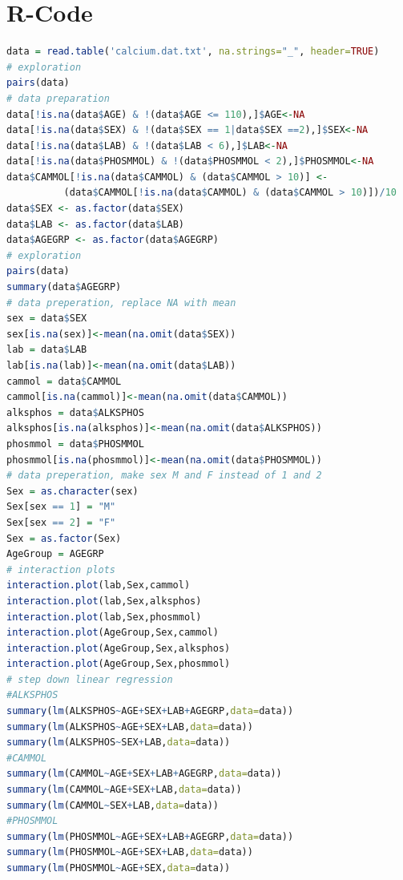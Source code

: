 \documentclass{article}
\begin{document}
  \section{R-Code}
    \begin{lstlisting}[language=R]
data = read.table('calcium.dat.txt', na.strings="_", header=TRUE)
# exploration
pairs(data)
# data preparation
data[!is.na(data$AGE) & !(data$AGE <= 110),]$AGE<-NA
data[!is.na(data$SEX) & !(data$SEX == 1|data$SEX ==2),]$SEX<-NA
data[!is.na(data$LAB) & !(data$LAB < 6),]$LAB<-NA
data[!is.na(data$PHOSMMOL) & !(data$PHOSMMOL < 2),]$PHOSMMOL<-NA
data$CAMMOL[!is.na(data$CAMMOL) & (data$CAMMOL > 10)] <- 
          (data$CAMMOL[!is.na(data$CAMMOL) & (data$CAMMOL > 10)])/10
data$SEX <- as.factor(data$SEX)
data$LAB <- as.factor(data$LAB)
data$AGEGRP <- as.factor(data$AGEGRP)
# exploration
pairs(data)
summary(data$AGEGRP)
# data preperation, replace NA with mean
sex = data$SEX
sex[is.na(sex)]<-mean(na.omit(data$SEX))
lab = data$LAB
lab[is.na(lab)]<-mean(na.omit(data$LAB))
cammol = data$CAMMOL
cammol[is.na(cammol)]<-mean(na.omit(data$CAMMOL))
alksphos = data$ALKSPHOS
alksphos[is.na(alksphos)]<-mean(na.omit(data$ALKSPHOS))
phosmmol = data$PHOSMMOL
phosmmol[is.na(phosmmol)]<-mean(na.omit(data$PHOSMMOL))
# data preperation, make sex M and F instead of 1 and 2
Sex = as.character(sex)
Sex[sex == 1] = "M"
Sex[sex == 2] = "F"
Sex = as.factor(Sex)
AgeGroup = AGEGRP
# interaction plots
interaction.plot(lab,Sex,cammol)
interaction.plot(lab,Sex,alksphos)
interaction.plot(lab,Sex,phosmmol)
interaction.plot(AgeGroup,Sex,cammol)
interaction.plot(AgeGroup,Sex,alksphos)
interaction.plot(AgeGroup,Sex,phosmmol)
# step down linear regression
#ALKSPHOS
summary(lm(ALKSPHOS~AGE+SEX+LAB+AGEGRP,data=data))
summary(lm(ALKSPHOS~AGE+SEX+LAB,data=data))
summary(lm(ALKSPHOS~SEX+LAB,data=data))
#CAMMOL
summary(lm(CAMMOL~AGE+SEX+LAB+AGEGRP,data=data))
summary(lm(CAMMOL~AGE+SEX+LAB,data=data))
summary(lm(CAMMOL~SEX+LAB,data=data))
#PHOSMMOL
summary(lm(PHOSMMOL~AGE+SEX+LAB+AGEGRP,data=data))
summary(lm(PHOSMMOL~AGE+SEX+LAB,data=data))
summary(lm(PHOSMMOL~AGE+SEX,data=data))
    \end{lstlisting}
\end{document}
